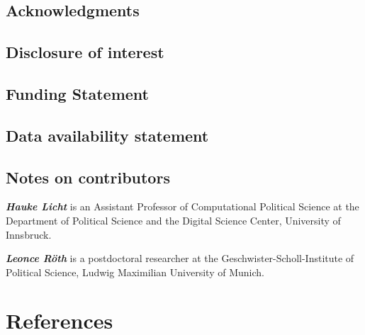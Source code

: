 \documentclass[12pt]{article}
\begin{document}
\medskip
\subsection*{Acknowledgments}




\subsection*{Disclosure of interest}




\subsection*{Funding Statement}




\subsection*{Data availability statement}




\subsection*{Notes on contributors}

\noindent \textbf{\textit{Hauke Licht}} is an Assistant Professor of Computational Political Science at the Department of Political Science and the Digital Science Center, University of Innsbruck.

\noindent \textbf{\textit{Leonce Röth}} is a postdoctoral researcher at the Geschwister-Scholl-Institute of Political Science, Ludwig Maximilian University of Munich.


\section{References}\label{references}

\begingroup
\end{document}
